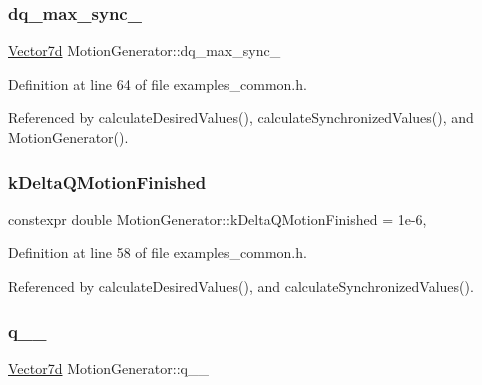 \subsubsection{\texorpdfstring{dq\+\_\+max\+\_\+sync\+\_\+}{dq\_max\_sync\_}}
{\footnotesize\ttfamily \hyperlink{classMotionGenerator_a499bd17d3a5c7583b4c06923f532185d}{Vector7d} Motion\+Generator\+::dq\+\_\+max\+\_\+sync\+\_\+\hspace{0.3cm}{\ttfamily [private]}}



Definition at line 64 of file examples\+\_\+common.\+h.



Referenced by calculate\+Desired\+Values(), calculate\+Synchronized\+Values(), and Motion\+Generator().

\mbox{\label{classMotionGenerator_a03e73e0857236b6e3061457bc969efb2}} 
\subsubsection{\texorpdfstring{k\+Delta\+Q\+Motion\+Finished}{kDeltaQMotionFinished}}
{\footnotesize\ttfamily constexpr double Motion\+Generator\+::k\+Delta\+Q\+Motion\+Finished = 1e-\/6\hspace{0.3cm}{\ttfamily [static]}, {\ttfamily [private]}}



Definition at line 58 of file examples\+\_\+common.\+h.



Referenced by calculate\+Desired\+Values(), and calculate\+Synchronized\+Values().

\mbox{\label{classMotionGenerator_a9e8620af632e541116e9b5e219f1ccbd}} 
\subsubsection{\texorpdfstring{q\+\_\+\_\+}{q\_1\_}}
{\footnotesize\ttfamily \hyperlink{classMotionGenerator_a499bd17d3a5c7583b4c06923f532185d}{Vector7d} Motion\+Generator\+::q\+\_\+\_\+\hspace{0.3cm}{\ttfamily [private]}}



